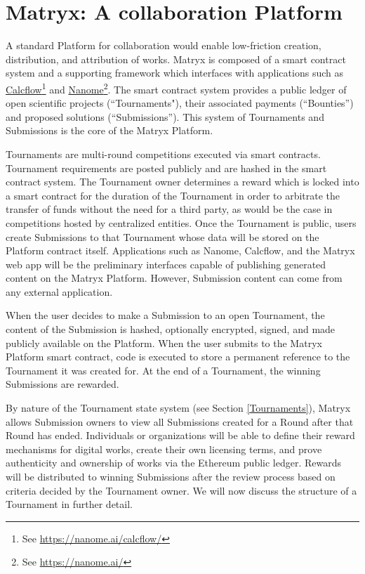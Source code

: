 \documentclass[a4paper, 10pt, conference]{ieeeconf}      %
\begin{document}
\section{Matryx: A collaboration Platform}
\label{matryx::acollaborationPlatform}
A standard Platform for collaboration would enable low-friction creation, distribution, and attribution of works. 
Matryx is composed of a smart contract system and a supporting framework which interfaces with applications such as \href{https://nanome.ai/calcflow/}{Calcflow}\footnote{See \href{https://nanome.ai/calcflow/}{https://nanome.ai/calcflow/}} and \href{https://nanome.ai/}{Nanome}\footnote{See \href{https://nanome.ai/}{https://nanome.ai/}}. 
The smart contract system provides a public ledger of open scientific projects (``Tournaments"), their associated payments (``Bounties”) and proposed solutions (``Submissions”). 
This system of Tournaments and Submissions is the core of the Matryx Platform.

Tournaments are multi-round competitions executed via smart contracts. 
Tournament requirements are posted publicly and are hashed in the smart contract system. 
The Tournament owner determines a reward which is locked into a smart contract for the duration of the Tournament in order to arbitrate the transfer of funds without the need for a third party, as would be the case in competitions hosted by centralized entities.
Once the Tournament is public, users create Submissions to that Tournament whose data will be stored on the Platform contract itself.
Applications such as Nanome, Calcflow, and the Matryx web app will be the preliminary interfaces capable of publishing generated content on the Matryx Platform. However, Submission content can come from any external application.

When the user decides to make a Submission to an open Tournament, the content of the Submission is hashed, optionally encrypted, signed, and made publicly available on the Platform.
When the user submits to the Matryx Platform smart contract, code is executed to store a permanent reference to the Tournament it was created for.
At the end of a Tournament, the winning Submissions are rewarded.

By nature of the Tournament state system  (see Section \ref{Tournaments}), Matryx allows Submission owners to view all Submissions created for a Round after that Round has ended.
Individuals or organizations will be able to define their reward mechanisms for digital works, create their own licensing terms, and prove authenticity and ownership of works via the Ethereum public ledger. 
Rewards will be distributed to winning Submissions after the review process based on criteria decided by the Tournament owner. We will now discuss the structure of a Tournament in further detail.
\end{document}
